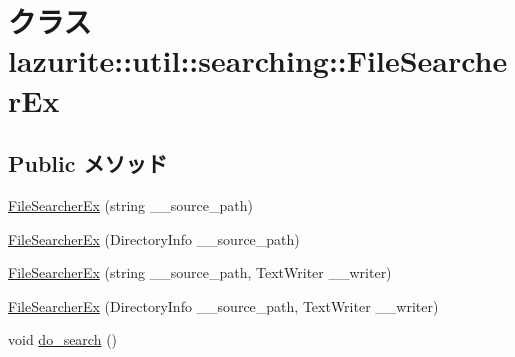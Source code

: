 \hypertarget{classlazurite_1_1util_1_1searching_1_1_file_searcher_ex}{
\section{クラス lazurite::util::searching::FileSearcherEx}
\label{classlazurite_1_1util_1_1searching_1_1_file_searcher_ex}
}
\subsection*{Public メソッド}
\begin{DoxyCompactItemize}
\item 
\hyperlink{classlazurite_1_1util_1_1searching_1_1_file_searcher_ex_a23d4fa743c5c9808593fc48d788c0d62}{FileSearcherEx} (string \_\-\_\-source\_\-path)
\item 
\hyperlink{classlazurite_1_1util_1_1searching_1_1_file_searcher_ex_a5163fca1831904ceb01c454699f6eec4}{FileSearcherEx} (DirectoryInfo \_\-\_\-source\_\-path)
\item 
\hyperlink{classlazurite_1_1util_1_1searching_1_1_file_searcher_ex_ae2756bb8d83eb1fe2cc1011b0f6fad6c}{FileSearcherEx} (string \_\-\_\-source\_\-path, TextWriter \_\-\_\-writer)
\item 
\hyperlink{classlazurite_1_1util_1_1searching_1_1_file_searcher_ex_a773cd75d110af4bddfe77fe07b7f42bd}{FileSearcherEx} (DirectoryInfo \_\-\_\-source\_\-path, TextWriter \_\-\_\-writer)
\item 
void \hyperlink{classlazurite_1_1util_1_1searching_1_1_file_searcher_ex_a38a7385fccb13858ad0f3f6b5a03d6db}{do\_\-search} ()
\end{DoxyCompactItemize}
